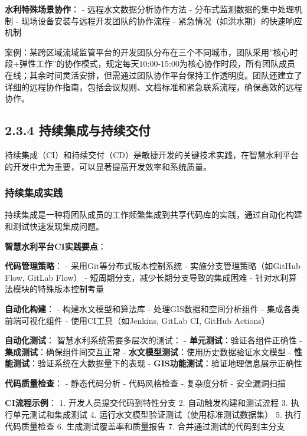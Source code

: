 \textbf{水利特殊场景协作}： - 远程水文数据分析协作方法 -
分布式监测数据的集中处理机制 - 现场设备安装与远程开发团队的协作流程 -
紧急情况（如洪水期）的快速响应机制

案例：某跨区域流域监管平台的开发团队分布在三个不同城市，团队采用''核心时段+弹性工作''的协作模式，规定每天10:00-15:00为核心协作时段，所有团队成员在线；其余时间灵活安排，但需通过团队协作平台保持工作透明度。团队还建立了详细的远程协作指南，包括会议规则、文档标准和紧急联系流程，确保高效的远程协作。

\subsection{2.3.4
持续集成与持续交付}\label{ux6301ux7eedux96c6ux6210ux4e0eux6301ux7eedux4ea4ux4ed8}

持续集成（CI）和持续交付（CD）是敏捷开发的关键技术实践，在智慧水利平台的开发中尤为重要，可以显著提高开发效率和系统质量。

\subsubsection{持续集成实践}\label{ux6301ux7eedux96c6ux6210ux5b9eux8df5}

持续集成是一种将团队成员的工作频繁集成到共享代码库的实践，通过自动化构建和测试快速发现集成问题。

\textbf{智慧水利平台CI实践要点}：

\textbf{代码管理策略}： - 采用Git等分布式版本控制系统 -
实施分支管理策略（如GitHub Flow, GitLab Flow） -
短周期分支，减少长期分支导致的集成困难 -
针对水利算法模块的特殊版本控制考量

\textbf{自动化构建}： - 构建水文模型和算法库 - 处理GIS数据和空间分析组件
- 集成各类前端可视化组件 - 使用CI工具（如Jenkins, GitLab CI, GitHub
Actions）

\textbf{自动化测试}： 智慧水利系统需要多层次的测试： -
\textbf{单元测试}：验证各组件正确性 -
\textbf{集成测试}：确保组件间交互正常 -
\textbf{水文模型测试}：使用历史数据验证水文模型 -
\textbf{性能测试}：验证系统在大数据量下的表现 -
\textbf{GIS功能测试}：验证地理信息展示正确性

\textbf{代码质量检查}： - 静态代码分析 - 代码风格检查 - 复杂度分析 -
安全漏洞扫描

\textbf{CI流程示例}： 1. 开发人员提交代码到特性分支 2.
自动触发构建和测试流程 3. 执行单元测试和集成测试 4.
运行水文模型验证测试（使用标准测试数据集） 5. 执行代码质量检查 6.
生成测试覆盖率和质量报告 7. 合并通过测试的代码到主分支

